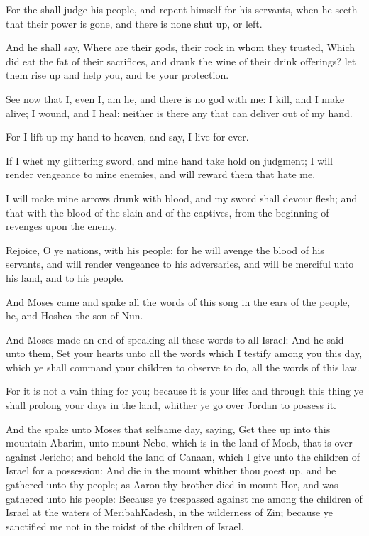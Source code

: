 \Verse For the \LORD shall judge his people, and repent himself for his servants, when he seeth that their power is gone, and there is none shut up, or left.

\Verse And he shall say, Where are their gods, their rock in whom they trusted, \Verse Which did eat the fat of their sacrifices, and drank the wine of their drink offerings? let them rise up and help you, and be your protection.

\Verse See now that I, even I, am he, and there is no god with me: I kill, and I make alive; I wound, and I heal: neither is there any that can deliver out of my hand.

\Verse For I lift up my hand to heaven, and say, I live for ever.

\Verse If I whet my glittering sword, and mine hand take hold on judgment; I will render vengeance to mine enemies, and will reward them that hate me.

\Verse I will make mine arrows drunk with blood, and my sword shall devour flesh; and that with the blood of the slain and of the captives, from the beginning of revenges upon the enemy.

\Verse Rejoice, O ye nations, with his people: for he will avenge the blood of his servants, and will render vengeance to his adversaries, and will be merciful unto his land, and to his people.

\Verse And Moses came and spake all the words of this song in the ears of the people, he, and Hoshea the son of Nun.

\Verse And Moses made an end of speaking all these words to all Israel: \Verse And he said unto them, Set your hearts unto all the words which I testify among you this day, which ye shall command your children to observe to do, all the words of this law.

\Verse For it is not a vain thing for you; because it is your life: and through this thing ye shall prolong your days in the land, whither ye go over Jordan to possess it.

\Verse And the \LORD spake unto Moses that selfsame day, saying, \Verse Get thee up into this mountain Abarim, unto mount Nebo, which is in the land of Moab, that is over against Jericho; and behold the land of Canaan, which I give unto the children of Israel for a possession: \Verse And die in the mount whither thou goest up, and be gathered unto thy people; as Aaron thy brother died in mount Hor, and was gathered unto his people: \Verse Because ye trespassed against me among the children of Israel at the waters of MeribahKadesh, in the wilderness of Zin; because ye sanctified me not in the midst of the children of Israel.

